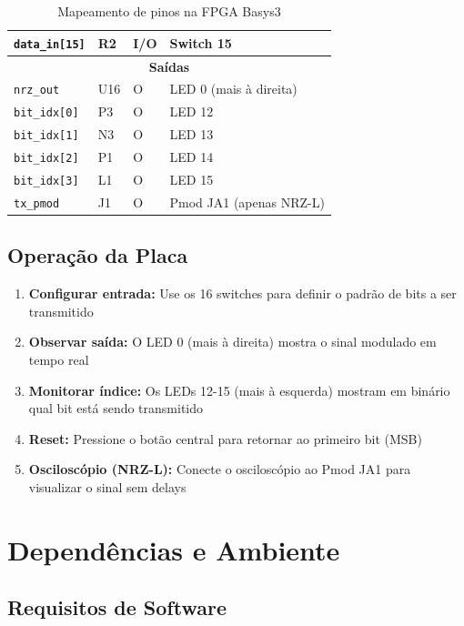 \documentclass[11pt,a4paper]{article}
\begin{document}
\begin{table}[H]
\begin{tabularx}{\textwidth}{|l|l|l|l|}
\hline
\texttt{data\_in[15]} & R2 & I/O & Switch 15 \\
\hline
\multicolumn{4}{|c|}{\textbf{Saídas}} \\
\hline
\texttt{nrz\_out} & U16 & O & LED 0 (mais à direita) \\
\hline
\texttt{bit\_idx[0]} & P3 & O & LED 12 \\
\hline
\texttt{bit\_idx[1]} & N3 & O & LED 13 \\
\hline
\texttt{bit\_idx[2]} & P1 & O & LED 14 \\
\hline
\texttt{bit\_idx[3]} & L1 & O & LED 15 \\
\hline
\texttt{tx\_pmod} & J1 & O & Pmod JA1 (apenas NRZ-L) \\
\hline
\end{tabularx}
\caption{Mapeamento de pinos na FPGA Basys3}
\end{table}

\subsection{Operação da Placa}

\begin{enumerate}
    \item \textbf{Configurar entrada:} Use os 16 switches para definir o padrão de bits a ser transmitido
    \item \textbf{Observar saída:} O LED 0 (mais à direita) mostra o sinal modulado em tempo real
    \item \textbf{Monitorar índice:} Os LEDs 12-15 (mais à esquerda) mostram em binário qual bit está sendo transmitido
    \item \textbf{Reset:} Pressione o botão central para retornar ao primeiro bit (MSB)
    \item \textbf{Osciloscópio (NRZ-L):} Conecte o osciloscópio ao Pmod JA1 para visualizar o sinal sem delays
\end{enumerate}

\section{Dependências e Ambiente}

\subsection{Requisitos de Software}
\end{document}
